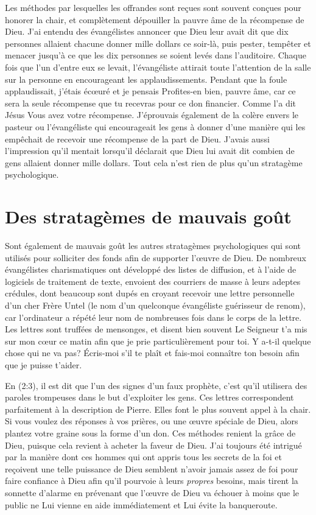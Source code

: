 Les méthodes par lesquelles les offrandes sont reçues
 sont souvent conçues pour honorer la chair, et complètement dépouiller
 la pauvre âme de la récompense de Dieu. J'ai entendu des évangélistes
 annoncer que Dieu leur avait dit que dix personnes allaient chacune donner
 mille dollars ce soir-là, puis pester, tempêter et menacer jusqu'à
 ce que les dix personnes se soient levés dans l'auditoire. Chaque fois que l'un d'entre eux
 se levait, l'évangéliste attirait toute l'attention de la salle sur la personne
 en encourageant les applaudissements. Pendant que la foule applaudissait,
 j'étais écœuré et je pensais\frcolon{} \Og Profites-en bien, pauvre âme,
 car ce sera la seule récompense que tu recevras pour ce don financier. \Fg{}
 Comme l'a dit Jésus\frcolon{} \Og Vous avez votre récompense. \Fg{}
 J'éprouvais également de la colère envers le pasteur
 ou l'évangéliste qui encourageait les gens à donner d'une manière
 qui les empêchait de recevoir une récompense de la part de Dieu.
 J'avais aussi l'impression qu'il mentait lorsqu'il déclarait
 que Dieu lui avait dit combien de gens allaient donner mille dollars.
 Tout cela n'est rien de plus qu'un stratagème psychologique.


\section{Des stratag\`emes de mauvais go\^ut}

Sont également de mauvais goût les autres stratagèmes psychologiques
 qui sont utilisés pour solliciter des fonds afin de supporter l'œuvre
 de Dieu. De nombreux évangélistes charismatiques ont développé
 des listes de diffusion, et à l'aide de logiciels de traitement
 de texte, envoient des courriers de masse à leurs adeptes crédules,
 dont beaucoup sont dupés en croyant recevoir une lettre personnelle
 d'un cher Frère Untel (le nom d'un quelconque évangéliste guérisseur
 de renom), car l'ordinateur a répété leur nom de nombreuses fois
 dans le corps de la lettre. Les lettres sont truffées de mensonges,
 et disent bien souvent\frcolon{} \Og Le Seigneur t'a mis sur mon cœur
 ce matin afin que je prie particulièrement pour toi.
 Y a-t-il quelque chose qui ne va pas? Écris-moi s'il te plaît
 et fais-moi connaître ton besoin afin que je puisse t'aider. \Fg{}

En (2:3), il est dit que l'un des signes
 d'un faux prophète, c'est qu'il utilisera des paroles trompeuses
 dans le but d'ex\-ploi\-ter les gens. Ces lettres correspondent parfaitement
 à la description de Pierre. Elles font le plus souvent appel à la chair.
 Si vous voulez des réponses à vos prières, ou une œuvre spéciale de Dieu,
 alors plantez votre graine sous la forme d'un don.
 Ces méthodes renient la grâce de Dieu, puisque cela revient à acheter
 la faveur de Dieu. J'ai toujours été intrigué par la manière dont
 ces hommes qui ont appris tous les secrets de la foi
 et reçoivent une telle puissance de Dieu semblent n'avoir jamais assez
 de foi pour faire confiance à Dieu afin qu'il pourvoie
 à leurs \emph{propres} besoins, mais tirent la sonnette d'alarme en prévenant que l'œuvre de Dieu
 va échouer à moins que le public ne Lui vienne en aide
 immédiatement et Lui évite la banqueroute.


